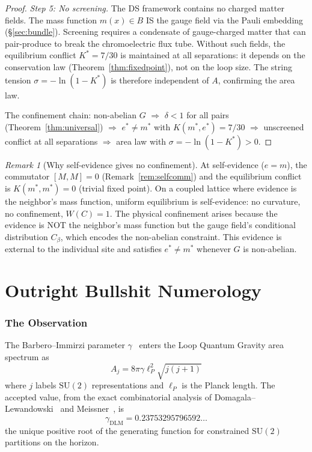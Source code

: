 \documentclass[11pt,a4paper]{article}
\theoremstyle{definition}
\theoremstyle{remark}
\newtheorem{remark}[theorem]{Remark}
\newcommand{\SU}{\mathrm{SU}}
\begin{document}
\begin{proof}
\emph{Step 5: No screening.} The DS framework contains no charged matter fields. The mass function $m(x)\in B$ IS the gauge field via the Pauli embedding (\S\ref{sec:bundle}). Screening requires a condensate of gauge-charged matter that can pair-produce to break the chromoelectric flux tube. Without such fields, the equilibrium conflict $K^*=7/30$ is maintained at all separations: it depends on the conservation law (Theorem~\ref{thm:fixedpoint}), not on the loop size. The string tension $\sigma=-\ln(1-K^*)$ is therefore independent of $A$, confirming the area law.

The confinement chain: non-abelian $G$ $\Rightarrow$ $\delta<1$ for all pairs (Theorem~\ref{thm:universal}) $\Rightarrow$ $e^*\neq m^*$ with $K(m^*,e^*)=7/30$ $\Rightarrow$ unscreened conflict at all separations $\Rightarrow$ area law with $\sigma=-\ln(1-K^*)>0$.
\end{proof}

\begin{remark}[Why self-evidence gives no confinement]
At self-evidence ($e=m$), the commutator $[M,M]=0$ (Remark~\ref{rem:selfcomm}) and the equilibrium conflict is $K(m^*,m^*)=0$ (trivial fixed point). On a coupled lattice where evidence is the neighbor's mass function, uniform equilibrium is self-evidence: no curvature, no confinement, $W(C)=1$. The physical confinement arises because the evidence is NOT the neighbor's mass function but the gauge field's conditional distribution $C_\beta$, which encodes the non-abelian constraint. This evidence is external to the individual site and satisfies $e^*\neq m^*$ whenever $G$ is non-abelian.
\end{remark}


\part{\textbf{Outright Bullshit Numerology}}\label{part:E}

\section{The Observation}\label{sec:BIobservation}

The Barbero--Immirzi parameter $\gamma$~\cite{Barbero1995,Immirzi1997} enters the Loop Quantum Gravity area spectrum as
\begin{equation}
A_j=8\pi\gamma\ell_P^2\sqrt{j(j+1)}
\end{equation}
where $j$ labels $\SU(2)$ representations and $\ell_P$ is the Planck length. The accepted value, from the exact combinatorial analysis of Domagala--Lewandowski~\cite{DL2004} and Meissner~\cite{Meissner2004}, is
\begin{equation}
\gamma_{\mathrm{DLM}}=0.23753295796592\ldots
\end{equation}
the unique positive root of the generating function for constrained $\SU(2)$ partitions on the horizon.
\end{document}
